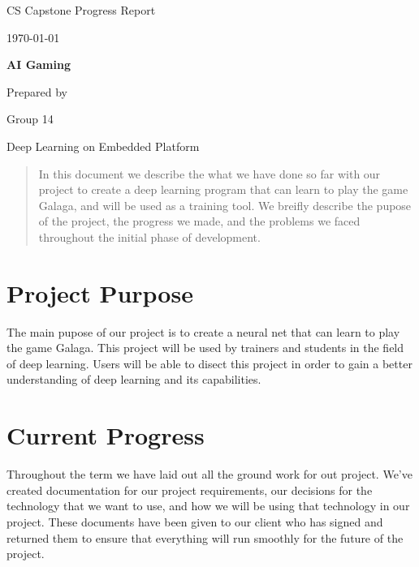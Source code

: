 \documentclass[onecolumn, draftclsnofoot,10pt, compsoc]{IEEEtran}
\def \CapstoneTeamName{		Deep Learning on Embedded Platform}
\def \CapstoneTeamNumber{		14}
\def \CapstoneProjectName{		AI Gaming}
\def \DocType{	%
				Progress Report
				}
\begin{document}
\begin{titlepage}
    \begin{singlespace}
        \hfill
        \par\vspace{.2in}
        \centering
        \scshape{
            \huge CS Capstone \DocType \par
            {\large\today}\par
            \vspace{.5in}
            \textbf{\Huge\CapstoneProjectName}\par
            {\large Prepared by }\par
            Group\CapstoneTeamNumber\par
            \CapstoneTeamName\par
            \vspace{5pt}
        }
        \begin{abstract}
        In this document we describe the what we have done so far with our project to create a deep learning program that can learn to play the game Galaga, and will be used as a training tool.
		We breifly describe the pupose of the project, the progress we made, and the problems we faced throughout the initial phase of development.

        \end{abstract}
    \end{singlespace}
\end{titlepage}

\newpage
{}
\tableofcontents

\section{Project Purpose}
The main pupose of our project is to create a neural net that can learn to play the game Galaga.
This project will be used by trainers and students in the field of deep learning.
Users will be able to disect this project in order to gain a better understanding of deep learning and its capabilities.

\section{Current Progress}
Throughout the term we have laid out all the ground work for out project.
We've created documentation for our project requirements, our decisions for the technology that we want to use, and how we will be using that technology in our project.
These documents have been given to our client who has signed and returned them to ensure that everything will run smoothly for the future of the project.
\end{document}
